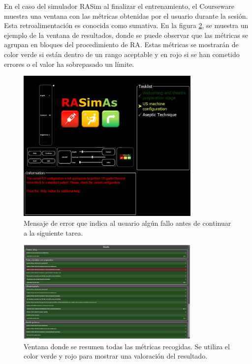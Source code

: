 En el caso del simulador \ac{RASim} al finalizar el entrenamiento, el \ac{Courseware} muestra una ventana con las métricas obtenidas por el usuario durante la sesión. Esta retroalimentación es conocida como sumativa. En la figura \ref{fig:resultui}, se muestra un ejemplo de la ventana de resultados, donde se puede observar que las métricas se agrupan en bloques del procedimiento de \ac{RA}. Estas métricas se mostrarán de color verde si están dentro de un rango aceptable y en rojo si se han cometido errores o el valor ha sobrepasado un límite.

\begin{figure}[ht]
    \centering
    \includegraphics[width=0.8\textwidth]{IMG/errorruntime.png}
    \caption{Mensaje de error que indica al usuario algún fallo antes de continuar a la siguiente tarea.}
    \label{fig:errorrun}
\end{figure}
\begin{figure}[ht]
    \centering
    \includegraphics[width=0.8\textwidth]{IMG/resultui.PNG}
    \caption{Ventana donde se resumen todas las métricas recogidas. Se utiliza el color verde y rojo para mostrar una valoración del resultado.}
    \label{fig:resultui}
\end{figure}





